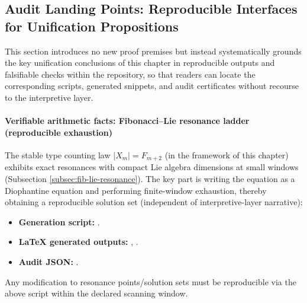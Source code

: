 \subsection{Audit Landing Points: Reproducible Interfaces for Unification Propositions}\label{subsec:group-unification-audit-pointers}

This section introduces no new proof premises but instead systematically grounds the key unification conclusions of this chapter in reproducible outputs and falsifiable checks within the repository,
so that readers can locate the corresponding scripts, generated snippets, and audit certificates without recourse to the interpretive layer.

\paragraph{Verifiable arithmetic facts: Fibonacci--Lie resonance ladder (reproducible exhaustion)}
The stable type counting law \(|X_m|=F_{m+2}\) (in the framework of this chapter) exhibits exact resonances with compact Lie algebra dimensions at small windows (Subsection \ref{subsec:fib-lie-resonance}).
The key part is writing the equation as a Diophantine equation and performing finite-window exhaustion, thereby obtaining a reproducible solution set (independent of interpretive-layer narrative):
\begin{itemize}
  \item \textbf{Generation script:} \texttt{}.
  \item \textbf{LaTeX generated outputs:} \texttt{},
  \texttt{}.
  \item \textbf{Audit JSON:} \texttt{}.
\end{itemize}
Any modification to resonance points/solution sets must be reproducible via the above script within the declared scanning window.

